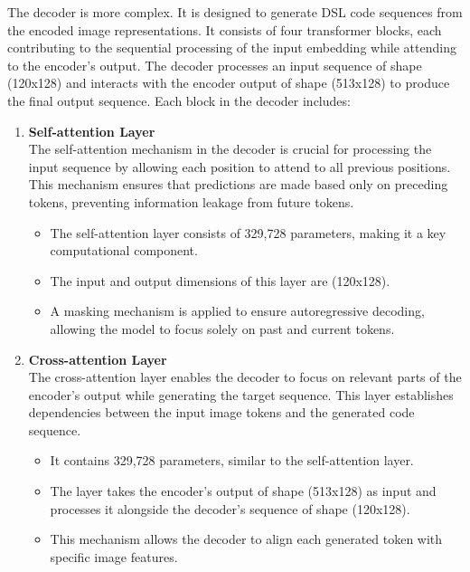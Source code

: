 The decoder is more complex. It is designed to generate DSL code sequences from the encoded image representations. It consists of four transformer blocks, each contributing to the sequential processing of the input embedding while attending to the encoder's output. The decoder processes an input sequence of shape (120x128) and interacts with the encoder output of shape (513x128) to produce the final output sequence.
Each block in the decoder includes:
\begin{enumerate}[label=\textbf{\roman*}]
    \item \textbf{Self-attention Layer} \\
    The self-attention mechanism in the decoder is crucial for processing the input sequence by allowing each position to attend to all previous positions. This mechanism ensures that predictions are made based only on preceding tokens, preventing information leakage from future tokens.
    
    \begin{itemize}
        \item The self-attention layer consists of 329,728 parameters, making it a key computational component.
        \item The input and output dimensions of this layer are (120x128).
        \item A masking mechanism is applied to ensure autoregressive decoding, allowing the model to focus solely on past and current tokens.
    \end{itemize}
    
    \item \textbf{Cross-attention Layer} \\
    The cross-attention layer enables the decoder to focus on relevant parts of the encoder's output while generating the target sequence. This layer establishes dependencies between the input image tokens and the generated code sequence.
    
    \begin{itemize}
        \item It contains 329,728 parameters, similar to the self-attention layer.
        \item The layer takes the encoder's output of shape (513x128) as input and processes it alongside the decoder's sequence of shape (120x128).
        \item This mechanism allows the decoder to align each generated token with specific image features.
    \end{itemize}
    

\end{enumerate}
